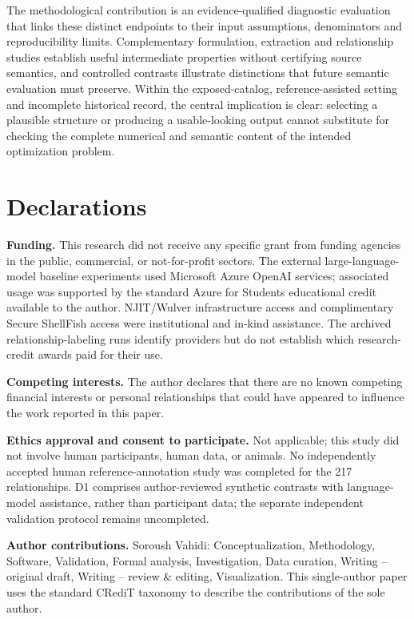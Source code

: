 \documentclass[pdflatex,sn-basic,Numbered]{sn-jnl}
\begin{document}
The methodological contribution is an evidence-qualified diagnostic evaluation that links these distinct endpoints to their input assumptions, denominators and reproducibility limits. Complementary formulation, extraction and relationship studies establish useful intermediate properties without certifying source semantics, and controlled contrasts illustrate distinctions that future semantic evaluation must preserve. Within the exposed-catalog, reference-assisted setting and incomplete historical record, the central implication is clear: selecting a plausible structure or producing a usable-looking output cannot substitute for checking the complete numerical and semantic content of the intended optimization problem.
\backmatter

\section*{Declarations}

\noindent\textbf{Funding.} This research did not receive any specific grant from funding agencies in the public, commercial, or not-for-profit sectors. The external large-language-model baseline experiments used Microsoft Azure OpenAI services; associated usage was supported by the standard Azure for Students educational credit available to the author. NJIT/Wulver infrastructure access and complimentary Secure ShellFish access were institutional and in-kind assistance. The archived relationship-labeling runs identify providers but do not establish which research-credit awards paid for their use.

\noindent\textbf{Competing interests.} The author declares that there are no known competing financial interests or personal relationships that could have appeared to influence the work reported in this paper.

\noindent\textbf{Ethics approval and consent to participate.} Not applicable; this study did not involve human participants, human data, or animals. No independently accepted human reference-annotation study was completed for the 217 relationships. D1 comprises author-reviewed synthetic contrasts with language-model assistance, rather than participant data; the separate independent validation protocol remains uncompleted.

\noindent\textbf{Author contributions.} Soroush Vahidi: Conceptualization, Methodology, Software, Validation, Formal analysis, Investigation, Data curation, Writing -- original draft, Writing -- review \& editing, Visualization. This single-author paper uses the standard CRediT taxonomy to describe the contributions of the sole author.
\end{document}
